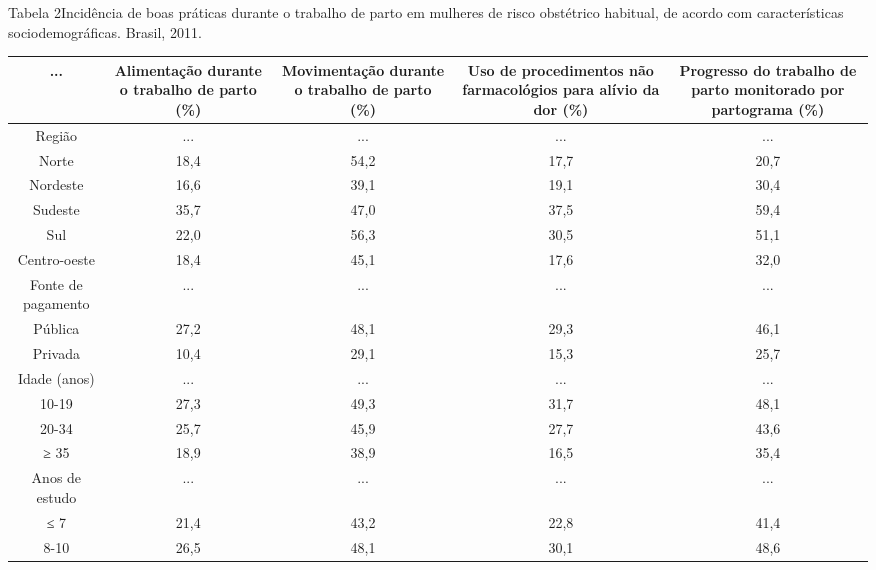 \documentclass{article}
\begin{document}
Tabela 2Incidência de boas práticas durante o trabalho de parto em mulheres
de risco obstétrico habitual, de acordo com características
sociodemográficas. Brasil, 2011.\begin{table}
\small\centering
\begin{tabulary}{\linewidth}{ C C C C C }
\hline... & Alimentação durante o trabalho de parto (\%) & Movimentação durante o
trabalho de parto (\%) & Uso de procedimentos não farmacológios para alívio da
dor
(\%) & Progresso do trabalho de parto monitorado por partograma
(\%)\\ \hline
Região
& ...
& ...
& ...
& ...
\\ \hline

Norte
& 18,4
& 54,2
& 17,7
& 20,7
\\ \hline

Nordeste
& 16,6
& 39,1
& 19,1
& 30,4
\\ \hline

Sudeste
& 35,7
& 47,0
& 37,5
& 59,4
\\ \hline

Sul
& 22,0
& 56,3
& 30,5
& 51,1
\\ \hline

Centro-oeste
& 18,4
& 45,1
& 17,6
& 32,0
\\ \hline

Fonte de pagamento
& ...
& ...
& ...
& ...
\\ \hline

Pública
& 27,2
& 48,1
& 29,3
& 46,1
\\ \hline

Privada
& 10,4
& 29,1
& 15,3
& 25,7
\\ \hline

Idade (anos)
& ...
& ...
& ...
& ...
\\ \hline

10-19
& 27,3
& 49,3
& 31,7
& 48,1
\\ \hline

20-34
& 25,7
& 45,9
& 27,7
& 43,6
\\ \hline

≥ 35
& 18,9
& 38,9
& 16,5
& 35,4
\\ \hline

Anos de estudo
& ...
& ...
& ...
& ...
\\ \hline

≤ 7
& 21,4
& 43,2
& 22,8
& 41,4
\\ \hline

8-10
& 26,5
& 48,1
& 30,1
& 48,6
\\ \hline


\end{tabulary}
\end{table}
\end{document}

